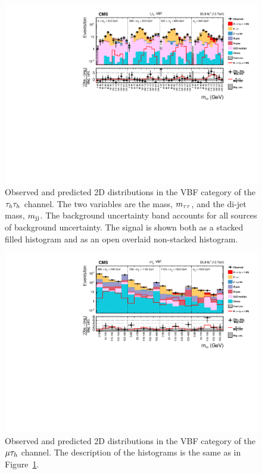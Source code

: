 \begin{figure}[htbp]
\centering
     \includegraphics[width=1.0\textwidth]{higgs_to_taus/plots/Figure_006.pdf}
     \caption{
Observed and predicted 2D distributions in the VBF category of the $\tau_{h}\tau_{h}$ channel.
The two variables are the mass, $m_{\tau\tau}$, and the di-jet mass, $m_\mathrm{jj}$.
The background uncertainty band accounts for all sources 
of background uncertainty. 
The signal is shown both as a stacked filled histogram and as an open overlaid non-stacked histogram.
}
     \label{fig:mass_tt_vbf}
\end{figure}

\begin{figure}[htbp]
\centering
     \includegraphics[width=1.0\textwidth]{higgs_to_taus/plots/Figure_007.pdf}
     \caption{Observed and predicted 2D distributions in the VBF category of the $\mu\tau_{h}$ channel. The description of the histograms is the same as in Figure~\ref{fig:mass_tt_vbf}.}
     \label{fig:mass_mt_vbf}
\end{figure}

